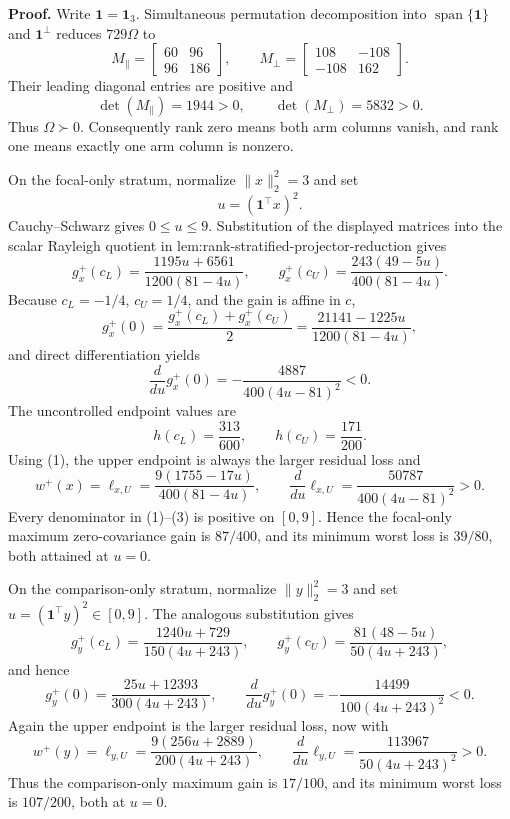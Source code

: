 \textbf{Proof.}
Write \(\mathbf1=\mathbf1_3\).  Simultaneous permutation decomposition into \(\operatorname{span}\{\mathbf1\}\) and \(\mathbf1^{\perp}\) reduces \(729\Omega\) to
\[
M_{\parallel}=\begin{bmatrix}60&96\\96&186\end{bmatrix},
\qquad
M_{\perp}=\begin{bmatrix}108&-108\\-108&162\end{bmatrix}.
\]
Their leading diagonal entries are positive and
\[
\det(M_{\parallel})=1944>0,
\qquad
\det(M_{\perp})=5832>0.
\]
Thus \(\Omega\succ0\).  Consequently rank zero means both arm columns vanish, and rank one means exactly one arm column is nonzero.

On the focal-only stratum, normalize \(\lVert x\rVert_2^2=3\) and set
\[
u=(\mathbf1^{\top}x)^2.
\]
Cauchy--Schwarz gives \(0\le u\le9\).  Substitution of the displayed matrices into the scalar Rayleigh quotient in lem:rank-stratified-projector-reduction gives
\[
g_x^+(c_L)=\frac{1195u+6561}{1200(81-4u)},
\qquad
g_x^+(c_U)=\frac{243(49-5u)}{400(81-4u)}.                           \tag{1}
\]
Because \(c_L=-1/4\), \(c_U=1/4\), and the gain is affine in \(c\),
\[
g_x^+(0)=\frac{g_x^+(c_L)+g_x^+(c_U)}2
=\frac{21141-1225u}{1200(81-4u)},
\]
and direct differentiation yields
\[
\frac{d}{du}g_x^+(0)
=-\frac{4887}{400(4u-81)^2}<0.                                    \tag{2}
\]
The uncontrolled endpoint values are
\[
h(c_L)=\frac{313}{600},
\qquad
h(c_U)=\frac{171}{200}.
\]
Using (1), the upper endpoint is always the larger residual loss and
\[
w^+(x)=\ell_{x,U}
=\frac{9(1755-17u)}{400(81-4u)},
\qquad
\frac{d}{du}\ell_{x,U}
=\frac{50787}{400(4u-81)^2}>0.                                    \tag{3}
\]
Every denominator in (1)--(3) is positive on \([0,9]\).  Hence the focal-only maximum zero-covariance gain is \(87/400\), and its minimum worst loss is \(39/80\), both attained at \(u=0\).

On the comparison-only stratum, normalize \(\lVert y\rVert_2^2=3\) and set \(u=(\mathbf1^{\top}y)^2\in[0,9]\).  The analogous substitution gives
\[
g_y^+(c_L)=\frac{1240u+729}{150(4u+243)},
\qquad
g_y^+(c_U)=\frac{81(48-5u)}{50(4u+243)},                            \tag{4}
\]
and hence
\[
g_y^+(0)=\frac{25u+12393}{300(4u+243)},
\qquad
\frac{d}{du}g_y^+(0)
=-\frac{14499}{100(4u+243)^2}<0.                                  \tag{5}
\]
Again the upper endpoint is the larger residual loss, now with
\[
w^+(y)=\ell_{y,U}
=\frac{9(256u+2889)}{200(4u+243)},
\qquad
\frac{d}{du}\ell_{y,U}
=\frac{113967}{50(4u+243)^2}>0.                                   \tag{6}
\]
Thus the comparison-only maximum gain is \(17/100\), and its minimum worst loss is \(107/200\), both at \(u=0\).

